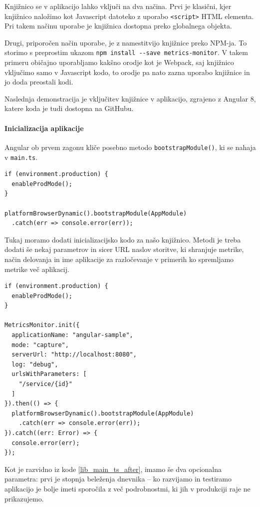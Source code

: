 \documentclass[a4paper, 12pt]{book}
\begin{document}
Knjižnico se v aplikacijo lahko vključi na dva načina. Prvi je klasični, kjer knjižnico naložimo kot Javascript datoteko z uporabo \verb|<script>| HTML elementa. Pri takem načinu uporabe je knjižnica dostopna preko globalnega objekta.

Drugi, priporočen način uporabe, je z namestitvijo knjižnice preko NPM-ja. To storimo s preprostim ukazom \verb|npm install --save metrics-monitor|. V takem primeru običajno uporabljamo kakšno orodje kot je Webpack, saj knjižnico vključimo samo v Javascript kodo, to orodje pa nato zazna uporabo knjižnice in jo doda preostali kodi.

Naslednja demonstracija je vključitev knjižnice v aplikacijo, zgrajeno z Angular 8, katere koda je tudi dostopna na GitHubu.

\paragraph{Inicializacija aplikacije} 
Angular ob prvem zagonu kliče posebno metodo \verb|bootstrapModule()|, ki se nahaja v \verb|main.ts|.

\begin{lstlisting}[label=lib_main_ts, caption=Zagon Angular aplikacije]
if (environment.production) {
  enableProdMode();
}

platformBrowserDynamic().bootstrapModule(AppModule)
  .catch(err => console.error(err));
\end{lstlisting}

Tukaj moramo dodati inicializacijsko kodo za našo knjižnico. Metodi je treba dodati še nekaj parametrov in sicer URL naslov storitve, ki shranjuje metrike, način delovanja in ime aplikacije za razločevanje v primerih ko spremljamo metrike več aplikacij. \\

\begin{lstlisting}[label=lib_main_ts_after, caption=Inicializacija knjižnice]
if (environment.production) {
  enableProdMode();
}

MetricsMonitor.init({
  applicationName: "angular-sample",
  mode: "capture",
  serverUrl: "http://localhost:8080",
  log: "debug",
  urlsWithParameters: [
    "/service/{id}"
  ]
}).then(() => {
  platformBrowserDynamic().bootstrapModule(AppModule)
    .catch(err => console.error(err));
}).catch((err: Error) => {
  console.error(err);
});
\end{lstlisting}

Kot je razvidno iz kode \ref{lib_main_ts_after}, imamo še dva opcionalna parametra: prvi je stopnja beleženja dnevnika -- ko razvijamo in testiramo aplikacijo je bolje imeti sporočila z več podrobnostmi, ki jih v produkciji raje ne prikazujemo.
\end{document}
